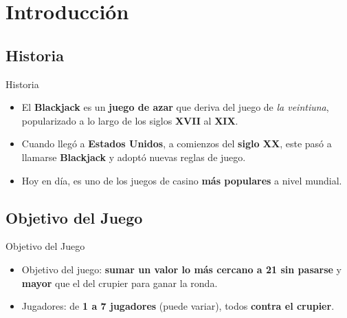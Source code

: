 \section{Introducción} %

 \subsection{Historia}
\begin{frame}{Historia}
    \begin{itemize}
        \item El \textbf{Blackjack} es un \textbf{juego de azar} que deriva del juego de \textit{la veintiuna}, popularizado a lo largo de los siglos \textbf{XVII} al \textbf{XIX}.
        \item Cuando llegó a \textbf{Estados Unidos}, a comienzos del \textbf{siglo XX}, este pasó a llamarse \textbf{Blackjack} y adoptó nuevas reglas de juego.
        \item Hoy en día, es uno de los juegos de casino \textbf{más populares} a nivel mundial.
    \end{itemize}
\end{frame}


\subsection{Objetivo del Juego}
\begin{frame}{Objetivo del Juego}
    \begin{itemize}
        \item Objetivo del juego: \textbf{sumar un valor lo más cercano a 21 sin pasarse} y \textbf{mayor} que el del crupier para ganar la ronda. 
        \item Jugadores: de \textbf{1 a 7 jugadores} (puede variar), todos \textbf{contra el crupier}.
    \end{itemize}
\end{frame}

